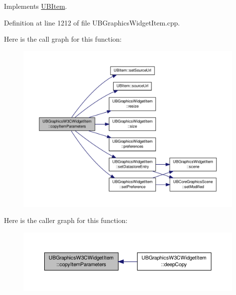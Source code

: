 Implements \hyperlink{class_u_b_item_a21483eccaad22369e9fe6bca838af029}{U\-B\-Item}.



Definition at line 1212 of file U\-B\-Graphics\-Widget\-Item.\-cpp.



Here is the call graph for this function\-:
\nopagebreak
\begin{figure}[H]
\begin{center}
\leavevmode
\includegraphics[width=350pt]{d7/da7/class_u_b_graphics_w3_c_widget_item_ac66c8274e94b6818db04a60e712ac97c_cgraph}
\end{center}
\end{figure}




Here is the caller graph for this function\-:
\nopagebreak
\begin{figure}[H]
\begin{center}
\leavevmode
\includegraphics[width=350pt]{d7/da7/class_u_b_graphics_w3_c_widget_item_ac66c8274e94b6818db04a60e712ac97c_icgraph}
\end{center}
\end{figure}


